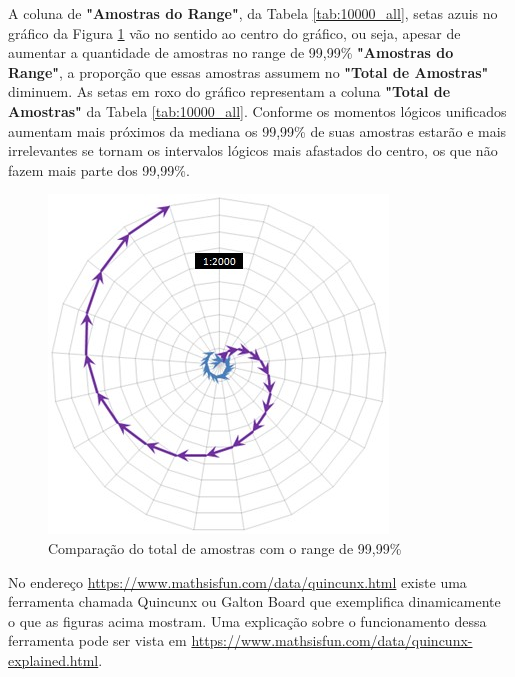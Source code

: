 A coluna de \textbf{"Amostras do Range"}, da Tabela \ref{tab:10000_all}, setas azuis no gráfico da Figura \ref{fig:total_comparison_chart_with_99_range} vão no sentido ao centro do gráfico, ou seja, apesar de aumentar a quantidade de amostras no range de 99,99\% \textbf{"Amostras do Range"}, a proporção que essas amostras assumem no \textbf{"Total de Amostras"}  diminuem. As setas em roxo do gráfico representam a coluna \textbf{"Total de Amostras"} da Tabela \ref{tab:10000_all}. Conforme os momentos lógicos unificados aumentam mais próximos da mediana os 99,99\% de suas amostras estarão e mais irrelevantes se tornam os intervalos lógicos mais afastados do centro, os que não fazem mais parte dos 99,99\%.
	\begin{figure}[H]
	\caption{Comparação do total de amostras com o range de 99,99\% }
	\label{fig:total_comparison_chart_with_99_range}
	\centering
	\includegraphics[scale=.9]{sections/images/total_comparison_chart_with_99_range.jpg}
	\end{figure}

No endereço \url{https://www.mathsisfun.com/data/quincunx.html} existe uma ferramenta chamada Quincunx ou Galton Board que exemplifica dinamicamente o que as figuras acima mostram. Uma explicação sobre o funcionamento dessa ferramenta pode ser vista em \url{https://www.mathsisfun.com/data/quincunx-explained.html}. 